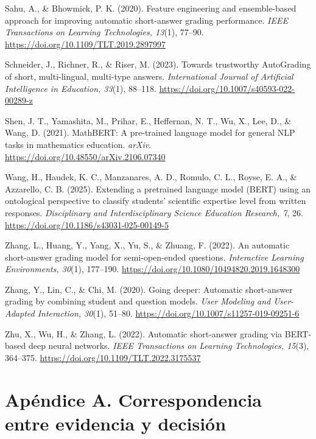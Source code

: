 \documentclass[11pt,oneside,openany]{book}
\begin{document}
\begin{list}{}{%
  \setlength{\leftmargin}{1.27cm}%
  \setlength{\itemindent}{-1.27cm}%
  \setlength{\itemsep}{0.9em}}
\item Sahu, A., \& Bhowmick, P. K. (2020). Feature engineering and ensemble-based
approach for improving automatic short-answer grading performance. \emph{IEEE
Transactions on Learning Technologies, 13}(1), 77--90.
\url{https://doi.org/10.1109/TLT.2019.2897997}

\item Schneider, J., Richner, R., \& Riser, M. (2023). Towards trustworthy
AutoGrading of short, multi-lingual, multi-type answers. \emph{International
Journal of Artificial Intelligence in Education, 33}(1), 88--118.
\url{https://doi.org/10.1007/s40593-022-00289-z}

\item Shen, J. T., Yamashita, M., Prihar, E., Heffernan, N. T., Wu, X., Lee, D., \&
Wang, D. (2021). MathBERT: A pre-trained language model for general NLP tasks in
mathematics education. \emph{arXiv}.
\url{https://doi.org/10.48550/arXiv.2106.07340}

\item Wang, H., Haudek, K. C., Manzanares, A. D., Romulo, C. L., Royse, E. A., \&
Azzarello, C. B. (2025). Extending a pretrained language model (BERT) using an
ontological perspective to classify students' scientific expertise level from
written responses. \emph{Disciplinary and Interdisciplinary Science Education
Research, 7}, 26. \url{https://doi.org/10.1186/s43031-025-00149-5}

\item Zhang, L., Huang, Y., Yang, X., Yu, S., \& Zhuang, F. (2022). An automatic
short-answer grading model for semi-open-ended questions. \emph{Interactive
Learning Environments, 30}(1), 177--190.
\url{https://doi.org/10.1080/10494820.2019.1648300}

\item Zhang, Y., Lin, C., \& Chi, M. (2020). Going deeper: Automatic short-answer
grading by combining student and question models. \emph{User Modeling and
User-Adapted Interaction, 30}(1), 51--80.
\url{https://doi.org/10.1007/s11257-019-09251-6}

\item Zhu, X., Wu, H., \& Zhang, L. (2022). Automatic short-answer grading via
BERT-based deep neural networks. \emph{IEEE Transactions on Learning Technologies,
15}(3), 364--375. \url{https://doi.org/10.1109/TLT.2022.3175537}

\end{list}
\normalsize

\chapter*{Apéndice A. Correspondencia entre evidencia y decisión}
\end{document}
